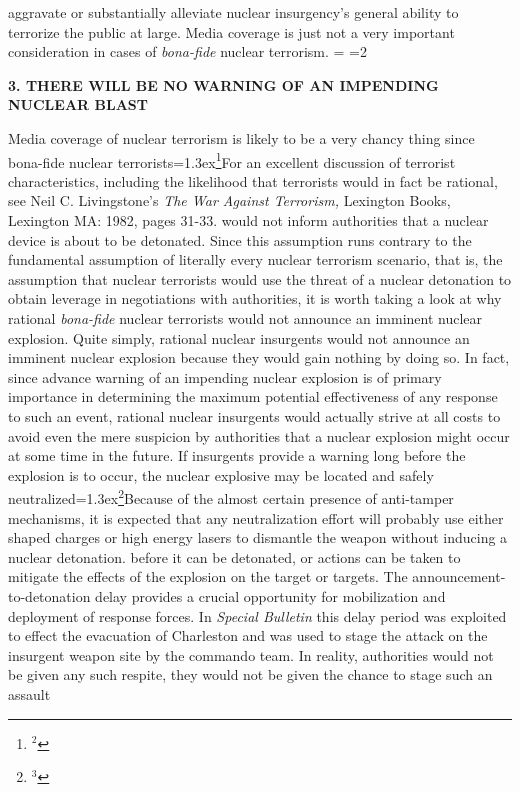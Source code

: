 aggravate or substantially alleviate nuclear insurgency's general ability to
terrorize the public at large. Media coverage is just not a very important
consideration in cases of {\it bona-fide} nuclear terrorism.
\headline={\hfill\folio{}\baselineskip}
=2
\bigskip\bigskip
\centerline{\bf 3. THERE WILL BE NO WARNING OF AN IMPENDING NUCLEAR BLAST}
\bigskip
Media coverage of nuclear terrorism is likely to be a very chancy thing
since bona-fide nuclear 
terrorists{\baselineskip=1.3ex{\footnote{$^{2}$}{For an excellent 
discussion of terrorist characteristics, including the
likelihood that terrorists would in fact be rational, see Neil 
C. Livingstone's {\it The War Against Terrorism,} Lexington Books, 
Lexington MA: 1982, pages
31-33.}}} would not inform authorities that a nuclear device is about to be
detonated. Since this assumption runs contrary to the fundamental assumption
of literally every nuclear terrorism scenario, that is, the assumption that 
nuclear terrorists would use the threat of a nuclear detonation to obtain
leverage in negotiations with authorities, it is worth taking a look at why
rational {\it bona-fide} nuclear terrorists would not announce an imminent
nuclear explosion.
\bigskip
Quite simply, rational nuclear insurgents would not announce an imminent 
nuclear explosion because they would gain nothing by doing so. In fact, 
since advance warning of an impending nuclear explosion is of primary
importance in determining the maximum potential effectiveness of any response
to such an event, rational nuclear insurgents would actually strive at 
all costs to avoid even the mere suspicion by authorities that a nuclear 
explosion might occur at some time in the future. If insurgents provide a
warning long before the explosion is to occur, the nuclear explosive may be 
located and safely neutralized{\baselineskip=1.3ex{\footnote{$^{3}$}{Because
of the almost certain presence of anti-tamper mechanisms, it is expected that
any neutralization effort will probably use either shaped charges or high
energy lasers to dismantle the weapon without inducing a nuclear detonation.}}}
before it can be detonated, or actions can be taken to mitigate the effects of
the explosion on the target or targets. The announcement-to-detonation delay
provides a crucial opportunity for mobilization and deployment of response
forces. In {\it Special Bulletin} this delay period was exploited to effect
the evacuation of Charleston and was used to stage the attack on the insurgent
weapon site by the commando team. In reality, authorities would not be given
any such respite, they would not be given the chance to stage such an assault

